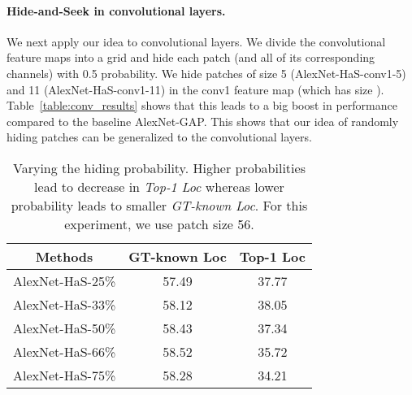 \vspace{-10pt}
\paragraph{Hide-and-Seek in convolutional layers.} We next apply our idea to convolutional layers.  We divide the convolutional feature maps into a grid and hide each patch (and all of its corresponding channels) with 0.5 probability.  We hide patches of size 5 (AlexNet-HaS-conv1-5) and 11 (AlexNet-HaS-conv1-11) in the conv1 feature map (which has size ).  Table~\ref{table:conv_results} shows that this leads to a big boost in performance compared to the baseline AlexNet-GAP. This shows that our idea of randomly hiding patches can be generalized to the convolutional layers. 





\begin{table}[t!]
              \begin{center}
                  \footnotesize
                  \begin{tabular}{| c | c | c|}
                  \hline    	
                  Methods & GT-known Loc &  Top-1 Loc\\
                  \hline

                  AlexNet-HaS-25\%            & 57.49 & 37.77  \\
                  AlexNet-HaS-33\%          & 58.12 & 38.05  \\
                  AlexNet-HaS-50\%            & 58.43 & 37.34  \\
                  AlexNet-HaS-66\%            &  58.52  & 35.72  \\
                  AlexNet-HaS-75\%             &  58.28  & 34.21  \\

                  \hline
                   \end{tabular}
                          \caption{Varying the hiding probability. Higher probabilities lead to decrease in \emph{Top-1 Loc} whereas lower probability leads to smaller \emph{GT-known Loc}. For this experiment, we use patch size 56.}
                          \label{table:drop_percent_results}
                          \end{center}
                          \vspace*{-0.13in}
                          \end{table}


